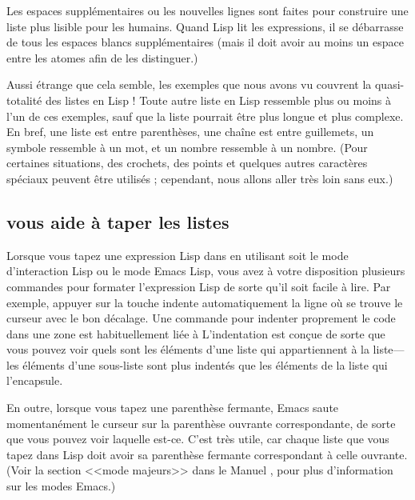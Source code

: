 Les espaces supplémentaires ou les nouvelles lignes sont faites pour
construire une liste plus lisible pour les humains. Quand Lisp lit les
expressions, il se débarrasse de tous les espaces blancs
supplémentaires (mais il doit avoir au moins un espace entre les
atomes afin de les distinguer.)

Aussi étrange que cela semble, les exemples que nous avons vu couvrent
la quasi-totalité des listes en Lisp ! Toute autre liste en Lisp
ressemble plus ou moins à l'un de ces exemples, sauf que la liste
pourrait être plus longue et plus complexe. En bref, une liste est
entre parenthèses, une chaîne est entre guillemets, un symbole
ressemble à un mot, et un nombre ressemble à un nombre. (Pour
certaines situations, des crochets, des points et quelques autres
caractères spéciaux peuvent être utilisés ; cependant, nous allons
aller très loin sans eux.)

\subsection{\gem vous aide à taper les listes}

Lorsque vous tapez une expression Lisp dans \gem en utilisant
soit le mode d'interaction Lisp ou le mode Emacs Lisp, vous avez à
votre disposition plusieurs commandes pour formater l'expression Lisp
de sorte qu'il soit facile à lire. Par exemple, appuyer sur la
touche \TAB indente automatiquement la ligne où se trouve le curseur
avec le bon décalage. Une commande pour indenter proprement le code
dans une zone est habituellement liée à 
L'indentation est conçue de sorte que vous pouvez voir quels sont les
éléments d'une liste qui appartiennent à la liste---les éléments d'une
sous-liste sont plus indentés que les éléments de la liste qui
l'encapsule.

En outre, lorsque vous tapez une parenthèse fermante, Emacs saute
momentanément le curseur sur la parenthèse ouvrante correspondante, de
sorte que vous pouvez voir laquelle est-ce. C'est très utile, car
chaque liste que vous tapez dans Lisp doit avoir sa parenthèse
fermante correspondant à celle ouvrante. (Voir la section <<mode
majeurs>> dans le Manuel \gem, pour plus d'information sur les
modes Emacs.)

